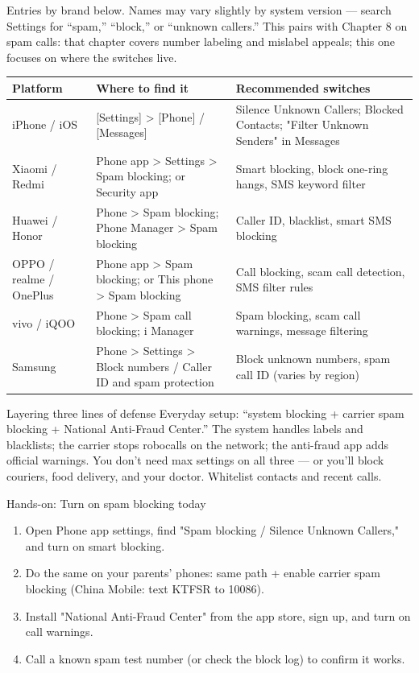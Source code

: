 
Entries by brand below. Names may vary slightly by system version — search Settings for “spam,” “block,” or “unknown callers.” This pairs with Chapter 8 on spam calls: that chapter covers number labeling and mislabel appeals; this one focuses on where the switches live.

\begin{center}
\begin{tabularx}{\linewidth}{|X|X|X|}
\hline
\textbf{Platform} & \textbf{Where to find it} & \textbf{Recommended switches} \tabularnewline
\hline
iPhone / iOS & {}[Settings] > [Phone] / [Messages] & Silence Unknown Callers; Blocked Contacts; "Filter Unknown Senders" in Messages \tabularnewline
Xiaomi / Redmi & Phone app > Settings > Spam blocking; or Security app & Smart blocking, block one-ring hangs, SMS keyword filter \tabularnewline
Huawei / Honor & Phone > Spam blocking; Phone Manager > Spam blocking & Caller ID, blacklist, smart SMS blocking \tabularnewline
OPPO / realme / OnePlus & Phone app > Spam blocking; or This phone > Spam blocking & Call blocking, scam call detection, SMS filter rules \tabularnewline
vivo / iQOO & Phone > Spam call blocking; i Manager & Spam blocking, scam call warnings, message filtering \tabularnewline
Samsung & Phone > Settings > Block numbers / Caller ID and spam protection & Block unknown numbers, spam call ID (varies by region) \tabularnewline
\hline
\end{tabularx}
\end{center}

\begin{tcbinfo}{Layering three lines of defense}
Everyday setup: “system blocking + carrier spam blocking + National Anti-Fraud Center.” The system handles labels and blacklists; the carrier stops robocalls on the network; the anti-fraud app adds official warnings. You don't need max settings on all three — or you'll block couriers, food delivery, and your doctor. Whitelist contacts and recent calls.

\end{tcbinfo}

\begin{tcbpractice}{Hands-on: Turn on spam blocking today}
\begin{enumerate}
  \item Open Phone app settings, find "Spam blocking / Silence Unknown Callers," and turn on smart blocking.
  \item Do the same on your parents' phones: same path + enable carrier spam blocking (China Mobile: text KTFSR to 10086).
  \item Install "National Anti-Fraud Center" from the app store, sign up, and turn on call warnings.
  \item Call a known spam test number (or check the block log) to confirm it works.
\end{enumerate}

\end{tcbpractice}

